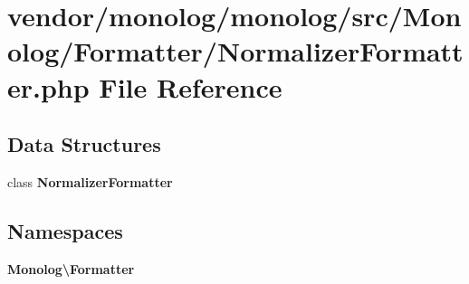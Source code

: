 \section{vendor/monolog/monolog/src/\+Monolog/\+Formatter/\+Normalizer\+Formatter.php File Reference}
\label{_normalizer_formatter_8php}
\subsection*{Data Structures}
\begin{DoxyCompactItemize}
\item 
class {\bf Normalizer\+Formatter}
\end{DoxyCompactItemize}
\subsection*{Namespaces}
\begin{DoxyCompactItemize}
\item 
 {\bf Monolog\textbackslash{}\+Formatter}
\end{DoxyCompactItemize}
